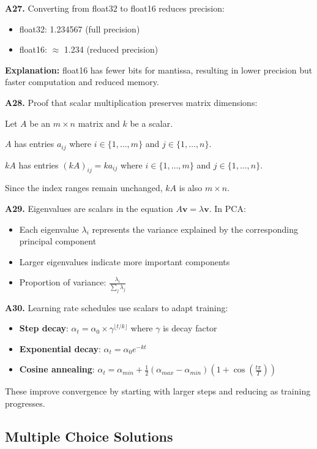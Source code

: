 \documentclass[11pt,a4paper]{article}
\begin{document}
\textbf{A27.} Converting from float32 to float16 reduces precision:
\begin{itemize}
    \item float32: 1.234567 (full precision)
    \item float16: $\approx$ 1.234 (reduced precision)
\end{itemize}

\textbf{Explanation:} float16 has fewer bits for mantissa, resulting in lower precision but faster computation and reduced memory.

\textbf{A28.} Proof that scalar multiplication preserves matrix dimensions:

Let $A$ be an $m \times n$ matrix and $k$ be a scalar.

$A$ has entries $a_{ij}$ where $i \in \{1, \ldots, m\}$ and $j \in \{1, \ldots, n\}$.

$kA$ has entries $(kA)_{ij} = ka_{ij}$ where $i \in \{1, \ldots, m\}$ and $j \in \{1, \ldots, n\}$.

Since the index ranges remain unchanged, $kA$ is also $m \times n$. \checkmark

\textbf{A29.} Eigenvalues are scalars in the equation $A\mathbf{v} = \lambda\mathbf{v}$. In PCA:
\begin{itemize}
    \item Each eigenvalue $\lambda_i$ represents the variance explained by the corresponding principal component
    \item Larger eigenvalues indicate more important components
    \item Proportion of variance: $\frac{\lambda_i}{\sum_j \lambda_j}$
\end{itemize}

\textbf{A30.} Learning rate schedules use scalars to adapt training:
\begin{itemize}
    \item \textbf{Step decay}: $\alpha_t = \alpha_0 \times \gamma^{\lfloor t/k \rfloor}$ where $\gamma$ is decay factor
    \item \textbf{Exponential decay}: $\alpha_t = \alpha_0 e^{-kt}$
    \item \textbf{Cosine annealing}: $\alpha_t = \alpha_{min} + \frac{1}{2}(\alpha_{max} - \alpha_{min})(1 + \cos(\frac{t\pi}{T}))$
\end{itemize}

These improve convergence by starting with larger steps and reducing as training progresses.

\subsection{Multiple Choice Solutions}
\end{document}
